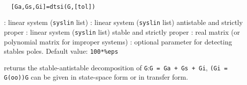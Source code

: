 \begin{mandesc}
   \\ %
\end{mandesc}
\begin{calling_sequence}
\begin{verbatim}
  [Ga,Gs,Gi]=dtsi(G,[tol])   
\end{verbatim}
\end{calling_sequence}
\begin{parameters}
  \begin{varlist}
    : linear system (\verb!syslin! list)
    : linear system (\verb!syslin! list) antistable and strictly proper
    : linear system (\verb!syslin! list) stable and strictly proper
    : real matrix (or polynomial matrix for improper systems)
    : optional parameter for detecting stables poles. Default value: \verb!100*%eps!
  \end{varlist}
\end{parameters}
\begin{mandescription}
  returns the stable-antistable decomposition of
  \verb!G!:\verb!G = Ga + Gs + Gi!, \verb!(Gi = G(oo))!\verb!G! can be given in
  state-space form or in transfer form.
\end{mandescription}
\begin{manseealso}
       
\end{manseealso}
